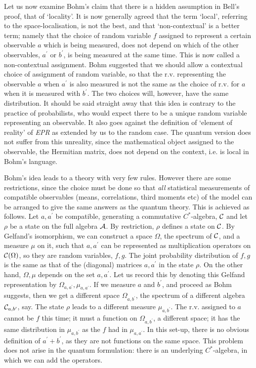 Let us now examine Bohm's claim that there is a hidden
assumption in Bell's proof, that of `locality'. It is now generally
agreed that the term `local', referring to the space-localisation,
is not the best, and that `non-contextual' is a better term; namely
that the choice of random variable $f$ assigned to represent a certain
observable $a$ which is being measured, does not depend on which of the
other observables, $a^\prime$ or $b^\prime$, is being measured at the
same time. This is now called a non-contextual assignment.
Bohm suggested that we should allow a contextual choice of
assignment of random variable, so that the r.v. representing the observable
$a$ when $a^\prime$ is also measured is not the same as the choice of r.v.
for $a$ when it is measured with $b^\prime$.
The two choices will, however, have the
same distribution. It should be said straight away that this idea is
contrary to the practice of probabilists, who would expect there to be
a unique random variable representing an observable. It also goes against
the definition of `element of reality' of {\em EPR} as extended by us
to the random case. The quantum version does not suffer from this unreality,
since the mathematical object assigned to the observable, the Hermitian
matrix, does not depend on the context, i.e. is local in Bohm's language.

Bohm's idea leads to a theory with very few rules.
However there are some restrictions, since the choice must
be done so that {\em all}
statistical measurements of compatible observables (means, correlations,
third moments etc) of the
model can be arranged to give the same answers as the quantum theory.
This is achieved as follows. Let $a,a^\prime$
be compatible, generating a commutative
$C^*$-algebra, ${\cal C}$ and let $\rho$ be a state on the full algebra
${\cal A}$. By restriction, $\rho$ defines a state on ${\cal C}$.
By Gelfand's isomorphism,
we can construct a space $\Omega$, the spectrum
of ${\cal C}$, and a measure $\mu$ on it, such that $a,a^\prime$ can be
represented as multiplication operators on ${\cal C}(\Omega)$, so
they are random variables, $f,g$. The joint probability
distribution of $f,g$ is the same as that of the (diagonal) matrices
$a,a^\prime$ in the state $\rho$.
On the other hand, $\Omega,\mu$ depends on the  set $a,a^\prime$. Let
us record this by denoting this Gelfand representation by $\Omega_{a,
a^\prime},\mu_{a,a^\prime}$. If we
measure $a$ and $b^\prime$, and proceed as Bohm suggests, then we get a
different space $\Omega_{a,b^\prime}$, the spectrum of a different algebra
${\cal C}_{a,b^\prime}$, say. The state $\rho$ leads to a different measure
$\mu_{a,b^\prime}$.
The r.v. assigned to $a$ cannot be $f$ this time;
it must a function on $\Omega_{a,b^\prime}$, a different space;
it has the same distribution in $\mu_{a,b^\prime}$ as the $f$ had in
$\mu_{a,a^\prime}$. In this set-up, there is no obvious definition of
$a^\prime+b^\prime$, as they are not functions on the same space.
This problem does not arise in the quantum formulation:
there is an underlying $C^*$-algebra, in which we can add the operators.

